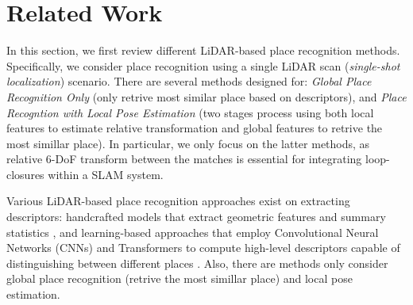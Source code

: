 \chapter{Related Work}
\label{sec:related}



In this section, we first review different LiDAR-based place recognition methods. Specifically, we consider place recognition using a single LiDAR scan (\emph{single-shot localization}) scenario.
There are several methods designed for: \emph{Global Place Recognition Only} (only retrive most similar place based on descriptors), and \emph{Place Recogntion with Local Pose Estimation} (two stages process using both local features to estimate relative transformation and global features to retrive the most simillar place). In particular, we only focus on the latter methods, as relative 6-DoF transform between the matches is essential for integrating loop-closures within a SLAM system.  


Various LiDAR-based place recognition approaches exist on extracting descriptors: handcrafted models that extract geometric features and summary statistics \cite{kim2018iros, yuan2023icra}, and learning-based approaches that employ Convolutional Neural Networks (CNNs) and Transformers to compute high-level descriptors capable of distinguishing between different places \cite{vidanapathirana2022icra, komorowski2022ral}. Also, there are methods only consider global place recognition (retrive the most simillar place) and local pose estimation.
 


